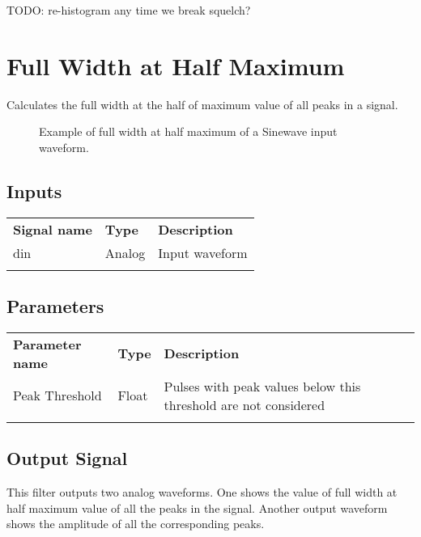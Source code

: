 TODO: re-histogram any time we break squelch?

\pagebreak
\section{Full Width at Half Maximum}
\label{filter:FullWidthHalfMaximum}

Calculates the full width at the half of maximum value of all peaks in a signal.

\begin{figure}[h]
\centering
{}
\caption{Example of full width at half maximum of a Sinewave input waveform. }
\label{filter_cdrpll}
\end{figure}

\subsection{Inputs}

\begin{tabularx}{16cm}{llX}
\thickhline
\textbf{Signal name} & \textbf{Type} & \textbf{Description} \\
\thickhline
din & Analog & Input waveform \\
\thickhline
\end{tabularx}

\subsection{Parameters}

\begin{tabularx}{16cm}{llX}
\thickhline
\textbf{Parameter name} & \textbf{Type} & \textbf{Description} \\
\thickhline
Peak Threshold & Float & Pulses with peak values below this threshold are not considered\\
\thickhline
\end{tabularx}

\subsection{Output Signal}

This filter outputs two analog waveforms. One shows the value of full width at half maximum value of all the peaks in the signal.
Another output waveform shows the amplitude of all the corresponding peaks.

